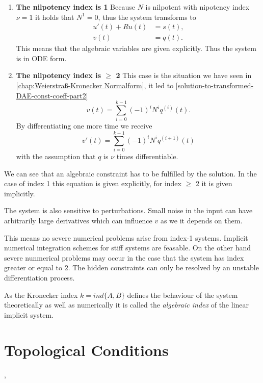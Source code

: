 \begin{enumerate}
	\item \textbf{The nilpotency index is 1} \newline
		Because $N$ is nilpotent with nipotency index $\nu = 1$ it holds that $N^1 = 0$, thus the system transforms to
		\begin{align*}
			u'(t) + Ru(t) &= s(t), \\
			v(t) &= q(t).
		\end{align*}
		This means that the algebraic variables are given explicitly. Thus the system is in ODE form.

	\item \textbf{The nilpotency index is $\geq$ 2} \newline
		This case is the situation we have seen in \ref{chap:Weierstraß-Kronecker Normalform}, it led to \ref{solution-to-transformed-DAE-const-coeff-part2}
		\begin{displaymath}
			v(t) = \sum_{i=0}^{k-1} (-1)^iN^iq^{(i)}(t).
		\end{displaymath}
		By differentiating one more time we receive
		\begin{equation}
			v'(t) = \sum_{i=0}^{k-1} (-1)^iN^iq^{(i+1)}(t)
		\end{equation}
		with the assumption that $q$ is $\nu$ times differentiable.
\end{enumerate}

We can see that an algebraic constraint has to be fulfilled by the solution. In the case of index 1 this equation is given explicitly, for index $\geq$ 2 it is given implicitly.

The system is also sensitive to perturbations. Small noise in the input can have arbitrarily large derivatives which can influence $v$ as we it depends on them.

This means no severe numerical problems arise from index-1 systems. Implicit numerical integration schemes for stiff systems are feasable. On the other hand severe nunmerical problems may occur in the case that the system has index greater or equal to $2$. The hidden constraints can only be resolved by an unstable differentiation process.

As the Kronecker index $k=ind\{A,B\}$ defines the behaviour of the system theoretically as well as numerically it is called the \emph{algebraic index} of the linear implicit system.

\section{Topological Conditions} 
\cite{Tischendorf2005Topological}, %
\cite{ModellingAndDiscretizationOfCircuitProblems}
\cite{DesoerCharlesA1969Bct}

